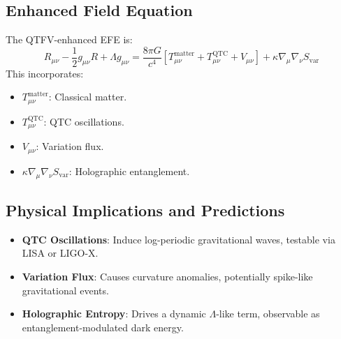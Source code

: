 \documentclass{article}
\theoremstyle{plain}
\theoremstyle{claimstyle}
\begin{document}
\subsection{Enhanced Field Equation}
The QTFV-enhanced EFE is:
\begin{equation}
R_{\mu\nu} - \frac{1}{2} g_{\mu\nu} R + \Lambda g_{\mu\nu} = \frac{8\pi G}{c^4} \left[ T_{\mu\nu}^{\text{matter}} + T_{\mu\nu}^{\text{QTC}} + V_{\mu\nu} \right] + \kappa \nabla_\mu \nabla_\nu S_{\text{var}}
\end{equation}
This incorporates:
\begin{itemize}
    \item \( T_{\mu\nu}^{\text{matter}} \): Classical matter.
    \item \( T_{\mu\nu}^{\text{QTC}} \): QTC oscillations.
    \item \( V_{\mu\nu} \): Variation flux.
    \item \( \kappa \nabla_\mu \nabla_\nu S_{\text{var}} \): Holographic entanglement.
\end{itemize}

\subsection{Physical Implications and Predictions}
\begin{itemize}
    \item \textbf{QTC Oscillations}: Induce log-periodic gravitational waves, testable via LISA or LIGO-X.
    \item \textbf{Variation Flux}: Causes curvature anomalies, potentially spike-like gravitational events.
    \item \textbf{Holographic Entropy}: Drives a dynamic \( \Lambda \)-like term, observable as entanglement-modulated dark energy.
\end{itemize}
\end{document}
